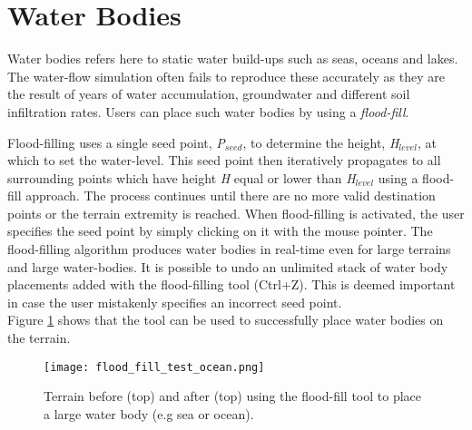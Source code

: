 \section{Water Bodies}

Water bodies refers here to static water build-ups such as seas, oceans and lakes. The water-flow simulation \label{sec:rivers_and_streams} often fails to reproduce these accurately as they are the result of years of water accumulation, groundwater and different soil infiltration rates. Users can place such water bodies by using a \textit{flood-fill}.

Flood-filling uses a single seed point, \textit{P$_{seed}$}, to determine the height, \textit{H$_{level}$}, at which to set the water-level. This seed point then iteratively propagates to all surrounding points which have height \textit{H} equal or lower than \textit{H$_{level}$} using a flood-fill approach. The process continues until there are no more valid destination points or the terrain extremity is reached. When flood-filling is activated, the user specifies the seed point by simply clicking on it with the mouse pointer. The flood-filling algorithm produces water bodies in real-time even for large terrains and large water-bodies. It is possible to undo an unlimited stack of water body placements added with the flood-filling tool (Ctrl+Z). This is deemed important in case the user mistakenly specifies an incorrect seed point. \\

Figure \ref{fig:flood_fill_test} shows that the tool can be used to successfully place water bodies on the terrain.

\begin{figure}
\center
	\texttt{[image: flood\_fill\_test\_ocean.png]}
	\caption{ Terrain before (top) and after (top) using the flood-fill tool to place a large water body (e.g sea or ocean). }	
	\label{fig:flood_fill_test}
\end{figure}
